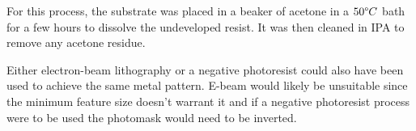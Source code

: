For this process, the substrate was placed in a beaker of acetone in a $50\degree C$ bath for a few hours to dissolve the undeveloped resist. It was then cleaned in IPA to remove any acetone residue.


Either electron-beam lithography or a negative photoresist could also have been used to achieve the same metal pattern. E-beam would likely be unsuitable since the minimum feature size doesn't warrant it and if a negative photoresist process were to be used the photomask would need to be inverted.
